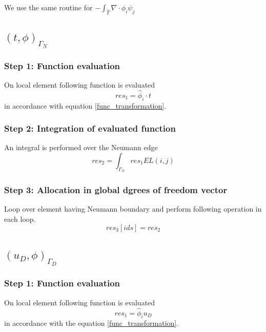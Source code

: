 \documentclass[a4paper,openany]{book}
\begin{document}
We use the same routine for $-\int_{\hat{T}} \nabla \cdot \phi_i \psi_j $

\subsection{$(t,\phi)_{\Gamma_N}$}

\subsubsection{Step 1: Function evaluation}

On local element following function is evaluated 
\begin{equation}
res_1=\hat{\phi}_i \cdot t
\end{equation} in accordance with equation  \ref{func_transformation}.

\subsubsection{Step 2: Integration of evaluated function}

An integral is performed over the Neumann edge 
\begin{equation}
res_2=\int_{\Gamma_N} res_1 EL(i,j)
\end{equation}

\subsubsection{Step 3: Allocation in global dgrees of freedom vector}

Loop over element having Neumann boundary and perform following operation in each loop.
\begin{equation}
res_3[ids]=res_2
\end{equation}

\subsection{$(u_D,\phi)_{\Gamma_D}$}

\subsubsection{Step 1: Function evaluation}

On local element following function is evaluated 
\begin{equation}
res_1=\hat{\phi}_i u_D
\end{equation} 
in accordance with the equation \eqref{func_transformation}.
\end{document}
